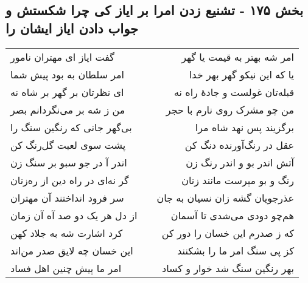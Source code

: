 \begin{center}
\section*{بخش ۱۷۵ - تشنیع زدن امرا بر ایاز کی چرا شکستش و جواب دادن ایاز ایشان را}
\label{sec:sh175}
\begin{longtable}{l p{0.5cm} r}
گفت ایاز ای مهتران نامور
&&
امر شه بهتر به قیمت یا گهر
\\
امر سلطان به بود پیش شما
&&
یا که این نیکو گهر بهر خدا
\\
ای نظرتان بر گهر بر شاه نه
&&
قبله‌تان غولست و جادهٔ راه نه
\\
من ز شه بر می‌نگردانم بصر
&&
من چو مشرک روی نارم با حجر
\\
بی‌گهر جانی که رنگین سنگ را
&&
برگزیند پس نهد شاه مرا
\\
پشت سوی لعبت گل‌رنگ کن
&&
عقل در رنگ‌آورنده دنگ کن
\\
اندر آ در جو سبو بر سنگ زن
&&
آتش اندر بو و اندر رنگ زن
\\
گر نه‌ای در راه دین از ره‌زنان
&&
رنگ و بو مپرست مانند زنان
\\
سر فرود انداختند آن مهتران
&&
عذرجویان گشه زان نسیان به جان
\\
از دل هر یک دو صد آه آن زمان
&&
هم‌چو دودی می‌شدی تا آسمان
\\
کرد اشارت شه به جلاد کهن
&&
که ز صدرم این خسان را دور کن
\\
این خسان چه لایق صدر من‌اند
&&
کز پی سنگ امر ما را بشکنند
\\
امر ما پیش چنین اهل فساد
&&
بهر رنگین سنگ شد خوار و کساد
\\
\end{longtable}
\end{center}
